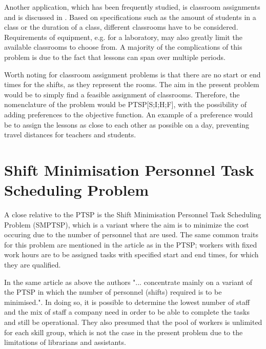 Another application, which has been frequently studied, is classroom assignments and is discussed in \citet{krishnamoorthy_2001}. Based on specifications such as the amount of students in a class or the duration of a class, different classrooms have to be considered. Requirements of equipment, e.g. for a laboratory, may also greatly limit the available classrooms to choose from. A majority of the complications of this problem is due to the fact that lessons can span over multiple periods. 

Worth noting for classroom assignment problems is that there are no start or end times for the shifts, as they represent the rooms. The aim in the present problem would be to simply find a feasible assignment of classrooms. Therefore, the nomenclature of the problem would be PTSP[S;I;H;F], with the possibility of adding preferences to the objective function. An example of a preference would be to assign the lessons as close to each other as possible on a day, preventing travel distances for teachers and students.



%
%



\section{Shift Minimisation Personnel Task Scheduling Problem}\label{SMTSP}
A close relative to the PTSP is the Shift Minimisation Personnel Task Scheduling Problem (SMPTSP), which is a variant where the aim is to minimize the cost occuring due to the number of personnel that are used. The same common traits for this problem are mentioned in the article \citet{krishnamoorthy_2012} as in the PTSP; workers with fixed work hours are to be assigned tasks with specified start and end times, for which they are qualified.

In the same article as above the authors "... concentrate mainly on a variant of the PTSP in which the number of personnel (shifts) required is to be minimised.". In doing so, it is possible to determine the lowest number of staff and the mix of staff a company need in order to be able to complete the tasks and still be operational. They also presumed that the pool of workers is unlimited for each skill group, which is not the case in the present problem due to the limitations of librarians and assistants. 

